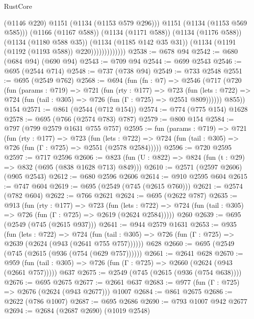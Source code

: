 \begin{lexlean}{RustCore}
\begin{coremodule}
{\begin{coremodule}
{{{{{{{{{                              (@1146 @220)
                              @1151
                              (@1134 (@1153 @579 @296)))
                            @1151
                            (@1134 (@1153 @569 @585)))
                          (@1166 (@1167 @588))
                          (@1134 (@1171 @588))
                          (@1134 (@1176 @588))
                          (@1134 (@1180 @588 @35))
                          (@1134 (@1185 @142 @35 @31))
                          (@1134 (@1191 (@1192 (@1193 @588)) @220)))))))))))))
@2538 := @678 @94
@2542 := @680 (@684 @94) (@690 @94)
@2543 := @709 @94
@2544 := @699 @2543
@2546 := @695 (@2544 @714)
@2548 := @737 (@738 @94)
@2549 := @733 @2548
@2551 := @695 (@2549 @762)
@2568 := @694
    (fun (fn : @7) =>
    @2546
      (@717
        (@720
          (fun (params : @719) =>
          @721
            (fun (rty : @177) =>
            @723
              (fun (lets : @722) =>
              @724 (fun (tail : @305) => @726 (fun (Γ : @725) => @2551 @809))))))
        @855))
    @154
@2571 := @861 (@2544 (@712 @154))
@2574 := @774 (@775 @154) @1628
@2578 := @695 (@766 (@2574 @783) @787)
@2579 := @800 @154
@2584 := @797 (@799 @2579 @1631 @755 @757)
@2595 := fun (params : @719) =>
  @721
    (fun (rty : @177) =>
    @723
      (fun (lets : @722) =>
      @724 (fun (tail : @305) => @726 (fun (Γ : @725) => @2551 (@2578 @2584)))))
@2596 := @720 @2595
@2597 := @717 @2596
@2606 := @823 (fun (U : @822) => @824 (fun (t : @29) => @832 (@695 (@838 @1628 @713) @849)))
@2610 := @2571 (@2597 @2606) (@905 @2543)
@2612 := @680 @2596 @2606
@2614 := @910 @2595 @604
@2615 := @747 @604
@2619 := @695 (@2549 (@745 (@2615 @760)))
@2621 := @2574 (@782 @604)
@2622 := @766 @2621
@2624 := @695 (@2622 @787)
@2635 := @913
    (fun (rty : @177) =>
    @723
      (fun (lets : @722) =>
      @724 (fun (tail : @305) => @726 (fun (Γ : @725) => @2619 (@2624 @2584)))))
    @260
@2639 := @695 (@2549 (@745 (@2615 @937)))
@2641 := @944 @2579 @1631
@2653 := @935
    (fun (lets : @722) =>
    @724 (fun (tail : @305) => @726 (fun (Γ : @725) => @2639 (@2624 (@943 (@2641 @755 @757))))))
    @628
@2660 := @695 (@2549 (@745 (@2615 (@936 (@754 (@629 @757))))))
@2661 := @2641 @628
@2670 := @959 (fun (tail : @305) => @726 (fun (Γ : @725) => @2660 (@2624 (@943 (@2661 @757))))) @637
@2675 := @2549 (@745 (@2615 (@936 (@754 @638))))
@2676 := @695 @2675
@2677 := @2661 @637
@2683 := @977 (fun (Γ : @725) => @2676 (@2624 (@943 @2677))) @1007
@2684 := @861 @2675
@2686 := @2622 (@786 @1007)
@2687 := @695 @2686
@2690 := @793 @1007 @942 @2677
@2694 := @2684 (@2687 @2690) (@1019 @2548)
}}}}}}}}}
\end{coremodule}}
\end{coremodule}
\end{lexlean}
